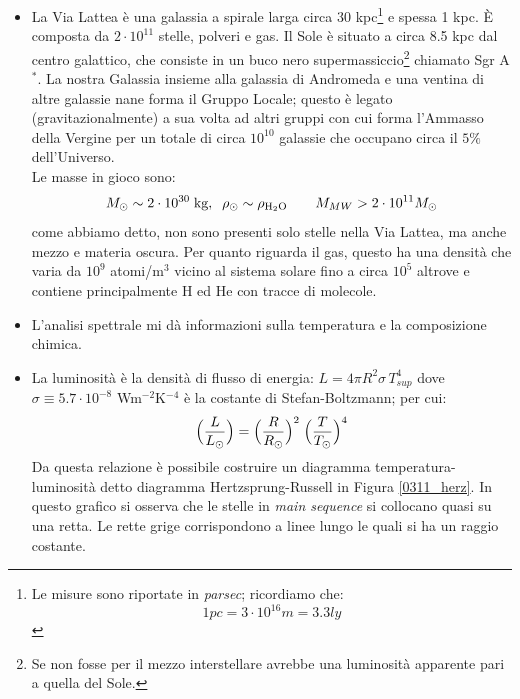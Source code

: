 \begin{itemize}
    \item La Via Lattea è una galassia a spirale larga circa 30 kpc\footnote{Le misure sono riportate in \textit{parsec}; ricordiamo che:
    $$1 \unit{pc} = 3\cdot 10^{16} \unit{m} = 3.3 \unit{ly}$$%
    } e spessa 1 kpc. \`E composta da $2\cdot 10^{11}$ stelle, polveri e gas. Il Sole è situato a circa 8.5 kpc dal centro galattico, che consiste in un buco nero supermassiccio\footnote{Se non fosse per il mezzo interstellare avrebbe una luminosità apparente pari a quella del Sole.} chiamato Sgr A$^*$. La nostra Galassia insieme alla galassia di Andromeda e una ventina di altre galassie nane forma il Gruppo Locale; questo è legato (gravitazionalmente) a sua volta ad altri gruppi con cui forma l'Ammasso della Vergine per un totale di circa $10^{10}$ galassie che occupano circa il $5\%$ dell'Universo.\\
    Le masse in gioco sono:
    $$M\sol\sim 2\cdot10^{30} \unit{kg}, \;\; \rho\sol \sim \rho_{\ce{H_2O}} \qquad M_{MW} > 2\cdot 10^{11} M\sol$$
    come abbiamo detto, non sono presenti solo stelle nella Via Lattea, ma anche mezzo e materia oscura. Per quanto riguarda il gas, questo ha una densità che varia da $10^9$ atomi/m$^3$ vicino al sistema solare fino a circa $10^5$ altrove e contiene principalmente H ed He con tracce di molecole.
    \item L'analisi spettrale mi dà informazioni sulla temperatura e la composizione chimica.
    \item La luminosità è la densità di flusso di energia: $L = 4\pi R^2 \sigma\, T_{sup}^4$ dove $\sigma \equiv 5.7\cdot10^{-8}$ Wm$^{-2}$K$^{-4}$ è  la costante di Stefan-Boltzmann; per cui:
    $$\Bigl ( \frac{L}{L_{\odot}} \Bigr ) = \Bigl ( \frac{R}{R_{\odot}}\Bigr )^2 \; \Bigl (\frac{T}{T_{\odot}} \Bigr )^4$$
    Da questa relazione è possibile costruire un diagramma temperatura-luminosità detto diagramma Hertzsprung-Russell in Figura \ref{0311_herz}. In questo grafico si osserva che le stelle in \textit{main sequence} si collocano quasi su una retta. Le rette grige corrispondono a linee lungo le quali si ha un raggio costante.
    \begin{figure}[h]

\end{figure}
\end{itemize}
